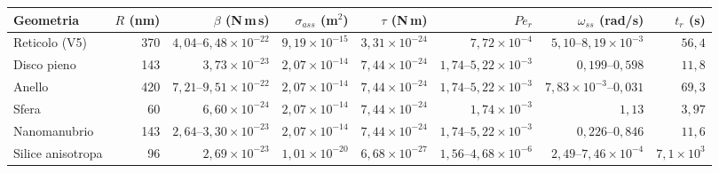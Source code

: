\begin{tabular}{lrrrrrrr}
\hline
Geometria & $R$ (nm) & $\beta$ (N\,m\,s) & $\sigma_{ass}$ (m$^2$) & $\tau$ (N\,m) & $Pe_r$ & $\omega_{ss}$ (rad/s) & $t_{r}$ (s) \\
\hline
Reticolo (V5) & 370 & $4{,}04$--$6{,}48\times10^{-22}$ & $9{,}19\times10^{-15}$ & $3{,}31\times10^{-24}$ & $7{,}72\times10^{-4}$ & $5{,}10$--$8{,}19\times10^{-3}$ & $56{,}4$ \\
Disco pieno & 143 & $3{,}73\times10^{-23}$ & $2{,}07\times10^{-14}$ & $7{,}44\times10^{-24}$ & $1{,}74$--$5{,}22\times10^{-3}$ & $0{,}199$--$0{,}598$ & $11{,}8$ \\
Anello & 420 & $7{,}21$--$9{,}51\times10^{-22}$ & $2{,}07\times10^{-14}$ & $7{,}44\times10^{-24}$ & $1{,}74$--$5{,}22\times10^{-3}$ & $7{,}83\times10^{-3}$--$0{,}031$ & $69{,}3$ \\
Sfera & 60 & $6{,}60\times10^{-24}$ & $2{,}07\times10^{-14}$ & $7{,}44\times10^{-24}$ & $1{,}74\times10^{-3}$ & $1{,}13$ & $3{,}97$ \\
Nanomanubrio & 143 & $2{,}64$--$3{,}30\times10^{-23}$ & $2{,}07\times10^{-14}$ & $7{,}44\times10^{-24}$ & $1{,}74$--$5{,}22\times10^{-3}$ & $0{,}226$--$0{,}846$ & $11{,}6$ \\
Silice anisotropa & 96 & $2{,}69\times10^{-23}$ & $1{,}01\times10^{-20}$ & $6{,}68\times10^{-27}$ & $1{,}56$--$4{,}68\times10^{-6}$ & $2{,}49$--$7{,}46\times10^{-4}$ & $7{,}1\times10^{3}$ \\
\hline
\end{tabular}
